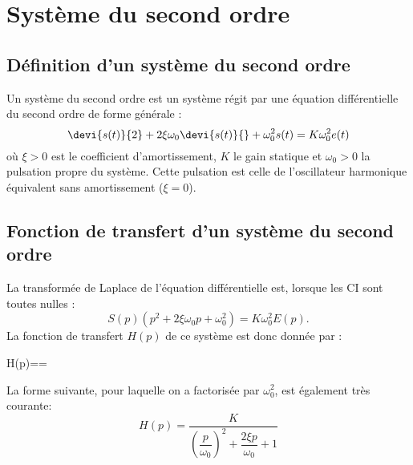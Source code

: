 \newpage
\section{Système du second ordre}

\subsection{Définition d'un système du second ordre}
Un système du second ordre est un système régit par une équation 
différentielle du second ordre de forme générale :
$$
\devi{s(t)}{2}+2\xi\omega_0\devi{s(t)}{}+\omega^2_0s(t)=K\omega^2_0e(t)
$$
où $\xi>0$ est le coefficient d'amortissement, $K$ le gain statique et 
$\omega_0>0$ la pulsation propre du système. Cette pulsation est celle de 
l'oscillateur harmonique équivalent sans amortissement ($\xi=0$).

\subsection{Fonction de transfert d'un système du second ordre}
La transformée de Laplace de l'équation différentielle est, lorsque les CI 
sont toutes nulles :
$$
S(p)\left(p^2+2\xi\omega_0p+\omega^2_0\right)=K\omega^2_0E(p).
$$
La fonction de transfert $H(p)$ de ce système est donc donnée par :
\begin{bequation}
    H(p)==
    \label{eq-2nd_ft}
\end{bequation}
La forme suivante, pour laquelle on a factorisée par $\omega^2_0$, est 
également très courante:
$$
H(p)=\dfrac{K}{\left(\dfrac{p}{\omega_0}\right)^2
    +\dfrac{2\xi p}{\omega_0}+1}
$$

